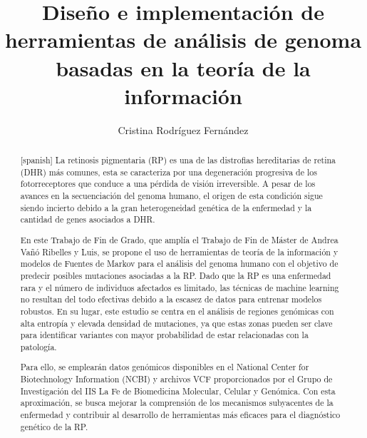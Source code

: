 \documentclass[11pt,spanish,listoffigures,listoftables]{tfgetsinf}
\title{Diseño e implementación de herramientas de análisis de genoma basadas en la teoría de la información}
\author{Cristina Rodríguez Fernández}
\begin{document}

\begin{abstract}[spanish]
   La retinosis pigmentaria (RP) es una de las distrofias hereditarias de retina (DHR) más comunes, esta se caracteriza por una degeneración progresiva de los fotorreceptores que conduce a una pérdida de visión irreversible. A pesar de los avances en la secuenciación del genoma humano, el origen de esta condición sigue siendo incierto debido a la gran heterogeneidad genética de la enfermedad y la cantidad de genes asociados a DHR.

   En este Trabajo de Fin de Grado, que amplía el Trabajo de Fin de Máster de Andrea Vañó Ribelles y Luis, se propone el uso de herramientas de teoría de la información y modelos de Fuentes de Markov para el análisis del genoma humano con el objetivo de predecir posibles mutaciones asociadas a la RP. Dado que la RP es una enfermedad rara y el número de individuos afectados es limitado, las técnicas de machine learning no resultan del todo efectivas debido a la escasez de datos para entrenar modelos robustos. En su lugar, este estudio se centra en el análisis de regiones genómicas con alta entropía y elevada densidad de mutaciones, ya que estas zonas pueden ser clave para identificar variantes con mayor probabilidad de estar relacionadas con la patología.
   
   Para ello, se emplearán datos genómicos disponibles en el National Center for Biotechnology Information (NCBI) y archivos VCF proporcionados por el Grupo de Investigación del IIS La Fe de Biomedicina Molecular, Celular y Genómica. Con esta aproximación, se busca mejorar la comprensión de los mecanismos subyacentes de la enfermedad y contribuir al desarrollo de herramientas más eficaces para el diagnóstico genético de la RP. 
   \\
   \\
   \end{abstract}
\end{document}
